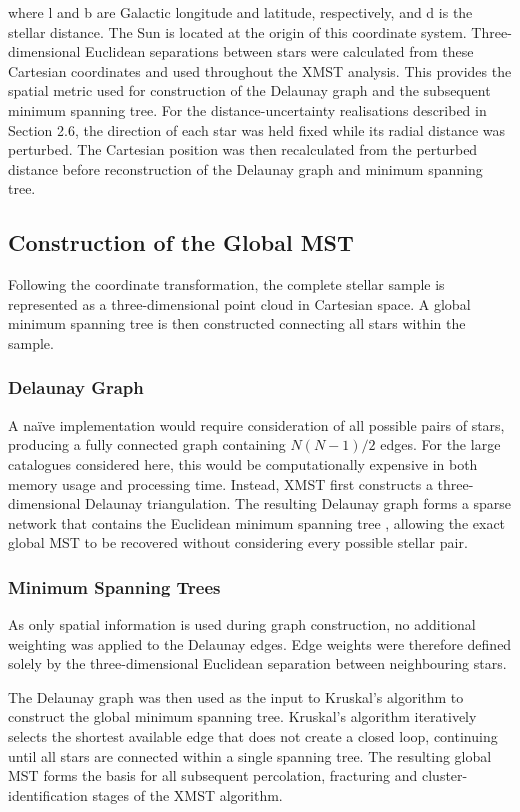 \documentclass[fleqn,usenatbib]{mnras}
\begin{document}
where l and b are Galactic longitude and latitude, respectively, and d is the stellar distance. The Sun is located at the origin of this coordinate system.
Three-dimensional Euclidean separations between stars were calculated from these Cartesian coordinates and used throughout the XMST analysis. This provides the spatial metric used for construction of the Delaunay graph and the subsequent minimum spanning tree.
For the distance-uncertainty realisations described in Section 2.6, the direction of each star was held fixed while its radial distance was perturbed. The Cartesian position was then recalculated from the perturbed distance before reconstruction of the Delaunay graph and minimum spanning tree.

\subsection{Construction of the Global MST}
Following the coordinate transformation, the complete stellar sample is represented as a three-dimensional point cloud in Cartesian space. A global minimum spanning tree is then constructed connecting all stars within the sample. 

\subsubsection{Delaunay Graph}
A naïve implementation would require consideration of all possible pairs of stars, producing a fully connected graph containing $N(N-1)/2$ edges. For the large catalogues considered here, this would be computationally expensive in both memory usage and processing time. Instead, XMST first constructs a three-dimensional Delaunay triangulation. The resulting Delaunay graph forms a sparse network that contains the Euclidean minimum spanning tree \citep{deBerg2008}, allowing the exact global MST to be recovered without considering every possible stellar pair.

\subsubsection{Minimum Spanning Trees}
As only spatial information is used during graph construction, no additional weighting was applied to the Delaunay edges. Edge weights were therefore defined solely by the three-dimensional Euclidean separation between neighbouring stars.

The Delaunay graph was then used as the input to Kruskal's algorithm to construct the global minimum spanning tree. Kruskal's algorithm \citep{Kruskal1956} iteratively selects the shortest available edge that does not create a closed loop, continuing until all stars are connected within a single spanning tree. The resulting global MST forms the basis for all subsequent percolation, fracturing and cluster-identification stages of the XMST algorithm. 
\end{document}
